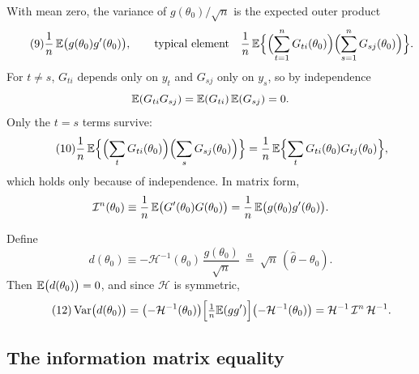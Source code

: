 \documentclass[11pt]{article}
\begin{document}
With mean zero, the variance of $g(\theta_{0})/\sqrt n$ is the expected outer product
\begin{equation}\tag{9}
 \frac1n\,\mathbb{E}\bigl(g(\theta_{0})g'(\theta_{0})\bigr),
 \qquad\text{typical element}\quad
 \frac1n\,\mathbb{E}\Bigl\{\Bigl(\sum_{t=1}^{n}G_{ti}(\theta_{0})\Bigr)\Bigl(\sum_{s=1}^{n}G_{sj}(\theta_{0})\Bigr)\Bigr\}.
\end{equation}
For $t\neq s$, $G_{ti}$ depends only on $y_{t}$ and $G_{sj}$ only on $y_{s}$, so by independence
\[ \mathbb{E}(G_{ti}G_{sj})=\mathbb{E}(G_{ti})\,\mathbb{E}(G_{sj})=0 . \] Only the $t=s$ terms survive:
\begin{equation}\tag{10}
 \frac1n\,\mathbb{E}\Bigl\{\Bigl(\sum_{t}G_{ti}(\theta_{0})\Bigr)\Bigl(\sum_{s}G_{sj}(\theta_{0})\Bigr)\Bigr\}
 =\frac1n\,\mathbb{E}\Bigl\{\sum_{t}G_{ti}(\theta_{0})G_{tj}(\theta_{0})\Bigr\},
\end{equation}
which holds only because of independence. In matrix form,
\[ \mathcal I^{n}(\theta_{0})\equiv\frac1n\,\mathbb{E}\bigl(G'(\theta_{0})G(\theta_{0})\bigr)
   =\frac1n\,\mathbb{E}\bigl(g(\theta_{0})g'(\theta_{0})\bigr). \]

Define
\begin{equation}\tag{11}
 d(\theta_{0})\equiv-\mathcal H^{-1}(\theta_{0})\,\frac{g(\theta_{0})}{\sqrt n}
 \ \overset{a}{=}\ \sqrt n\,(\hat\theta-\theta_{0}).
\end{equation}
Then $\mathbb{E}\bigl(d(\theta_{0})\bigr)=0$, and since $\mathcal H$ is symmetric,
\begin{equation}\tag{12}
 \operatorname{Var}\bigl(d(\theta_{0})\bigr)
 =\bigl(-\mathcal H^{-1}(\theta_{0})\bigr)\Bigl[\tfrac1n\mathbb{E}(gg')\Bigr]\bigl(-\mathcal H^{-1}(\theta_{0})\bigr)
 =\mathcal H^{-1}\,\mathcal I^{n}\,\mathcal H^{-1}.
\end{equation}

\subsection{The information matrix equality}
\end{document}
